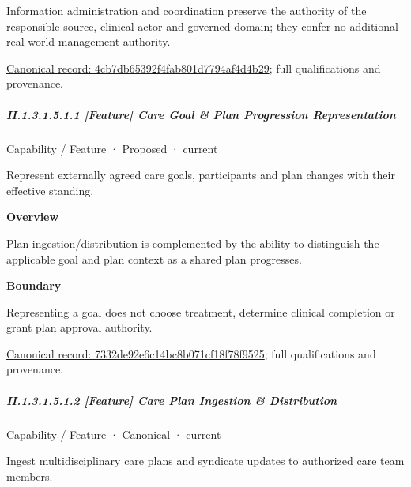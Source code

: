 Information administration and coordination preserve the authority of the responsible source, clinical actor and governed domain; they confer no additional real-world management authority.


{\footnotesize \href{../../../../../../../continuum/strategy/capability/4cb7db65392f4fab801d7794af4d4b29.md}{Canonical record: 4cb7db65392f4fab801d7794af4d4b29}; full qualifications and provenance.}\par
\subparagraph*{II.1.3.1.5.1.1 [Feature] Care Goal \& Plan Progression Representation}
\label{navigation:II.1.3.1.5.1.1}

\label{element:7332de92e6c14bc8b071cf18f78f9525}
{\small Capability / Feature · Proposed · current}\par

Represent externally agreed care goals, participants and plan changes with their effective standing.



\textbf{Overview}



Plan ingestion/distribution is complemented by the ability to distinguish the applicable goal and plan context as a shared plan progresses.



\textbf{Boundary}



Representing a goal does not choose treatment, determine clinical completion or grant plan approval authority.


{\footnotesize \href{../../../../../../../continuum/strategy/capability/feature/7332de92e6c14bc8b071cf18f78f9525.md}{Canonical record: 7332de92e6c14bc8b071cf18f78f9525}; full qualifications and provenance.}\par
\subparagraph*{II.1.3.1.5.1.2 [Feature] Care Plan Ingestion \& Distribution}
\label{navigation:II.1.3.1.5.1.2}

\label{element:6d4b374a6bca4b58a86c912a94bbd6b1}
{\small Capability / Feature · Canonical · current}\par

Ingest multidisciplinary care plans and syndicate updates to authorized care team members.



